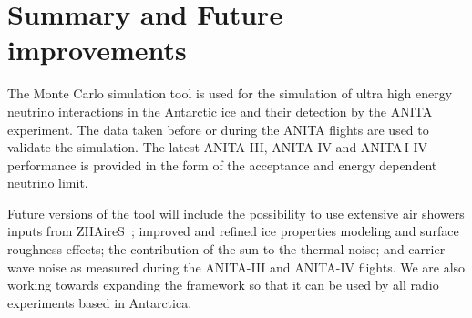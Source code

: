 \section{Summary and Future improvements}
\label{sec:future}
The \icemc Monte Carlo simulation tool is used for the
simulation of ultra high energy neutrino interactions in the Antarctic
ice and their detection by the ANITA experiment.
The data taken before or during the ANITA flights are used to validate the
simulation.
The latest ANITA-III, ANITA-IV and ANITA\,I-IV performance is provided in the form of the
acceptance and energy dependent neutrino limit.
 
Future versions of the tool will include the possibility to use extensive air showers inputs from ZHAireS~\cite{alvarez2012monte}; improved and refined ice properties modeling and surface roughness effects; the contribution of the sun to the thermal noise; and carrier wave noise as measured during the ANITA-III and ANITA-IV flights.
We are also working towards expanding the framework so that it can be used by all radio experiments based in Antarctica.
